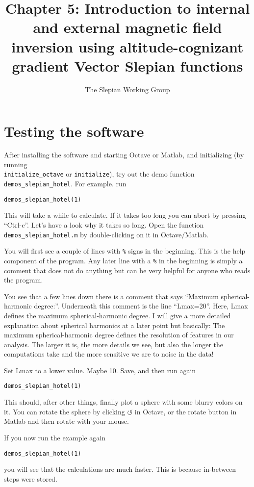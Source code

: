 \documentclass[11pt]{article}
\title{Chapter 5: Introduction to internal and external magnetic field inversion using altitude-cognizant gradient Vector Slepian functions}
\author{The Slepian Working Group}
\begin{document}
\maketitle


\section{Testing the software}

After installing the software and starting Octave or Matlab, and
initializing (by running \\
\verb+initialize_octave+ or
\verb+initialize+), try out the demo function
\verb+demos_slepian_hotel+. For example. run

\verb+demos_slepian_hotel(1)+

This will take a while to calculate. If it takes too long you can
abort by pressing ``Ctrl-c''. Let's have a look why it takes so
long. Open the function \verb+demos_slepian_hotel.m+ by double-clicking
on it in Octave/Matlab.

You will first see a couple of lines with \verb+%+ signs in the
beginning. This is the help component of the program. Any later line
with a \verb+%+ in the beginning is simply a comment that does not do
anything but can be very helpful for anyone who reads the program.

You see that a few lines down there is a comment that says ``Maximum
spherical-harmonic degree:''. Underneath this comment is the line
``Lmax=20''. Here, Lmax defines the maximum spherical-harmonic
degree. I will give a more detailed explanation about spherical
harmonics at a later point but basically: The maximum
spherical-harmonic degree defines the resolution of features in our
analysis. The larger it is, the more details we see, but also the
longer the computations take and the more sensitive we are to noise in
the data!

Set Lmax to a lower value. Maybe 10. Save, and then run again

\qquad \verb+demos_slepian_hotel(1)+

This should, after other things, finally plot a sphere with some
blurry colors on it. You can rotate the sphere by clicking $\circlearrowleft$ in
Octave, or the rotate button in Matlab and then rotate with your mouse.

If you now run the example again

\qquad \verb+demos_slepian_hotel(1)+

you will see that the calculations are much faster. This is because
in-between steps were stored.
\end{document}
